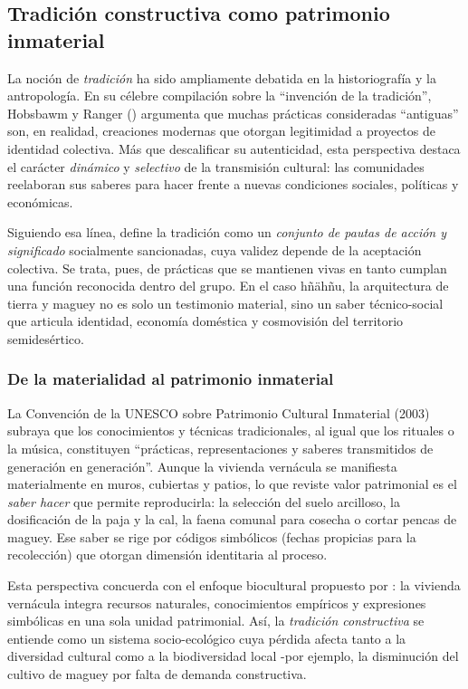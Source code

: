 \subsection{Tradición constructiva como patrimonio inmaterial}
\label{subsec:tradicion_constructiva}

La noción de \emph{tradición} ha sido ampliamente debatida en la
historiografía y la antropología.  En su célebre compilación sobre la
``invención de la tradición'', Hobsbawm y Ranger (\citeyear{hobsbawm1983inventar})
argumenta que muchas prácticas consideradas “antiguas” son, en realidad,
creaciones modernas que otorgan legitimidad a proyectos de identidad
colectiva.  Más que descalificar su autenticidad, esta perspectiva
destaca el carácter \emph{dinámico} y \emph{selectivo} de la
transmisión cultural: las comunidades reelaboran sus saberes para hacer
frente a nuevas condiciones sociales, políticas y económicas.

Siguiendo esa línea, \citeauthor{herrejon1994} define la tradición como
un \emph{conjunto de pautas de acción y significado}
socialmente sancionadas, cuya validez depende de la aceptación
colectiva.\citep{herrejon1994}  Se trata, pues, de prácticas que se
mantienen vivas en tanto cumplan una función reconocida dentro del
grupo.  En el caso hñähñu, la arquitectura de tierra y maguey no es
solo un testimonio material, sino un saber técnico-social que articula
identidad, economía doméstica y cosmovisión del territorio
semidesértico.

\subsubsection{De la materialidad al patrimonio inmaterial}

La Convención de la UNESCO sobre Patrimonio Cultural Inmaterial (2003)
subraya que los conocimientos y técnicas
tradicionales, al igual que los rituales o la música, constituyen
``prácticas, representaciones y saberes transmitidos de
generación en generación''.  Aunque la vivienda vernácula se manifiesta
materialmente en muros, cubiertas y patios, lo que reviste valor
patrimonial es el \emph{saber hacer} que permite reproducirla: la
selección del suelo arcilloso, la dosificación de la paja y la cal, la
faena comunal para cosecha o cortar pencas de maguey.  Ese saber
se rige por códigos simbólicos (fechas propicias
para la recolección) que otorgan dimensión identitaria al proceso.

Esta perspectiva concuerda con el enfoque biocultural propuesto por
\cite{chang2010patrimonio}: la vivienda
vernácula integra recursos naturales, conocimientos empíricos y
expresiones simbólicas en una sola unidad patrimonial.  Así, la
\emph{tradición constructiva} se entiende como un sistema
socio-ecológico cuya pérdida afecta tanto a la diversidad cultural como
a la biodiversidad local -por ejemplo, la disminución del cultivo de
maguey por falta de demanda constructiva.

